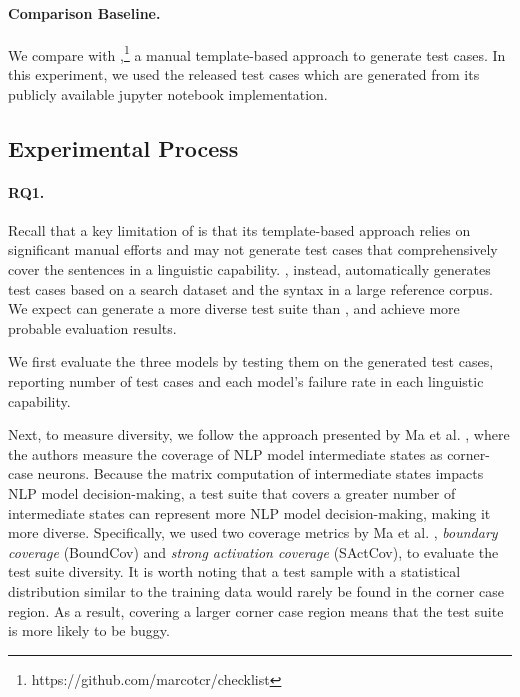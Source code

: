 \paragraph{\textbf{Comparison Baseline.}}
We compare \tool with
\Cklst,\footnote{https://github.com/marcotcr/checklist} a
manual template-based approach to generate test cases. In this
experiment, we used the \Cklst released \sa test cases which are
generated from its publicly available jupyter notebook implementation.


\subsection{Experimental Process}

\paragraph{\textbf{RQ1.}}
Recall that a key limitation of \Cklst is that its template-based
approach relies on significant manual efforts and may not generate test cases that comprehensively cover the sentences
in a linguistic capability. \tool, instead, automatically generates test cases based on a search
dataset and the syntax in a large reference corpus. 
We expect \tool can generate a more diverse test suite than \Cklst, and achieve
more probable evaluation results.

We first evaluate the three \sa
models by testing them on the \tool generated test cases, reporting number of test cases and each model's failure rate in each linguistic capability.

Next,
to measure diversity, we follow the approach presented by Ma et al. \cite{ma2018deepgauge},
where the authors measure the coverage of NLP model intermediate states as corner-case neurons.
Because the matrix computation of intermediate states impacts NLP model decision-making, a test suite that covers a greater number of intermediate states can represent more NLP model decision-making, making it more diverse.
Specifically, we used two coverage metrics by Ma et al. \cite{ma2018deepgauge}, \textit{boundary coverage} (BoundCov) and \textit{strong activation coverage} (SActCov), to evaluate the test suite diversity.
It is worth noting that a test sample with a statistical distribution similar to the training data would rarely be found in the corner case region. As a result, covering a larger corner case region means that the test suite is more likely to be buggy.


